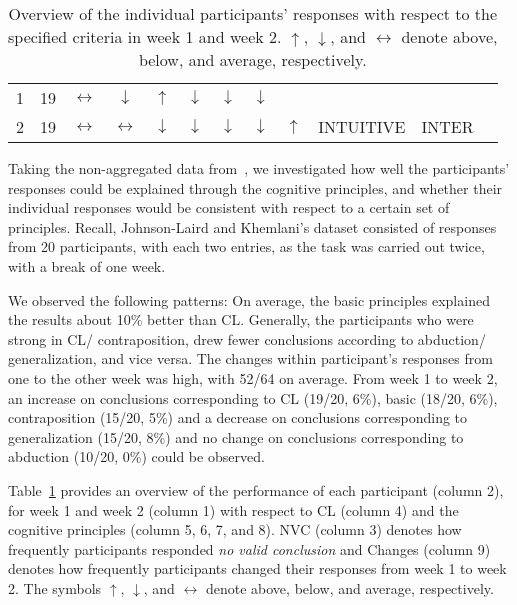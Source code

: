 \documentclass[12pt]{article}
\begin{document}
\begin{table}[htp]
\begin{tabular}{cccccccccccc}
1&19&$\leftrightarrow$&$\downarrow$&$\uparrow$&$\downarrow$&$\downarrow$&$\downarrow$ &&&\\
2&19&$\leftrightarrow$&$\leftrightarrow$&$\downarrow$&$\downarrow$&$\downarrow$&$\downarrow$ &\multirow{-2}{*}{$\uparrow$}& \multirow{-2}{*}{INTUITIVE}& \multirow{-2}{*}{INTER}\\ \bottomrule
\end{tabular}
\caption{Overview of the individual participants' responses with respect to the specified criteria in week 1 and week 2.
$\uparrow$, $\downarrow$, and $\leftrightarrow$ denote above, below, and average, respectively.
\label{tab:individual}}
\end{table}

Taking the non-aggregated data from~\cite{khemlani:2016},
we investigated how well the participants' responses could be explained through the cognitive principles,
and whether their individual responses would be consistent with respect to a certain set of principles. Recall, Johnson-Laird and Khemlani's dataset consisted of responses from 20 participants, with each two entries,
as the task was carried out twice, with a break of one week.

We observed the following patterns:
On average, the basic principles explained the results about 10\;\% better than CL.
 Generally, the participants who were strong in CL/ contraposition, drew fewer conclusions according to abduction/ generalization, and vice versa.
 The changes within participant's responses from one to the other week was high, with 52/64 on average. 
 From week 1 to week 2, an increase on conclusions corresponding to CL (19/20, 6\;\%), basic (18/20, 6\;\%), contraposition (15/20, 5\;\%)
 and a decrease on conclusions corresponding to generalization (15/20, 8\;\%) and no change on
 conclusions corresponding to abduction (10/20, 0\;\%) could be observed.

Table~\ref{tab:individual} provides an overview of the performance  of each participant (column 2), for week 1 and week 2 (column 1)
with respect to CL (column 4) and the cognitive principles (column 5, 6, 7, and 8).
NVC (column 3) denotes how frequently participants responded \textit{no valid conclusion} and Changes (column 9) denotes how
frequently participants changed their responses from week 1 to week 2. 
The symbols $\uparrow$, $\downarrow$, and $\leftrightarrow$ denote above, below, and average, respectively.
\end{document}
